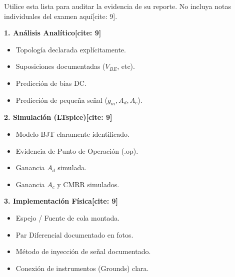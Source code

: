 \documentclass[11pt, a4paper]{article}
\begin{document}
\begin{tcolorbox}[colback=ucbblue!5, colframe=ucbblue, title=\textbf{Checklist de Revisión: Informe Técnico Grupal Hito 2}]
    Utilice esta lista para auditar la evidencia de su reporte. No incluya notas individuales del examen aquí[cite: 9].
\end{tcolorbox}

\begin{minipage}[t]{0.48\textwidth}
    \textbf{1. Análisis Analítico[cite: 9]}
    \begin{itemize}
        \item[$\square$] Topología declarada explícitamente.
        \item[$\square$] Suposiciones documentadas ($V_{BE}$, etc).
        \item[$\square$] Predicción de bias DC.
        \item[$\square$] Predicción de pequeña señal ($g_m, A_d, A_c$).
    \end{itemize}
    
    \textbf{2. Simulación (LTspice)[cite: 9]}
    \begin{itemize}
        \item[$\square$] Modelo BJT claramente identificado.
        \item[$\square$] Evidencia de Punto de Operación (.op).
        \item[$\square$] Ganancia $A_d$ simulada.
        \item[$\square$] Ganancia $A_c$ y CMRR simulados.
    \end{itemize}
    
    \textbf{3. Implementación Física[cite: 9]}
    \begin{itemize}
        \item[$\square$] Espejo / Fuente de cola montada.
        \item[$\square$] Par Diferencial documentado en fotos.
        \item[$\square$] Método de inyección de señal documentado.
        \item[$\square$] Conexión de instrumentos (Grounds) clara.
    \end{itemize}
\end{minipage}\hfill
\end{document}
